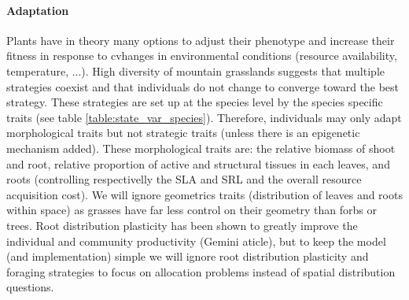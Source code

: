 \documentclass[a4paper,twoside, justified,marginals=raggedright]{tufte-handout}
\begin{document}
\paragraph{Adaptation} Plants have in theory many options to adjust their phenotype and increase their fitness in response to cvhanges in environmental conditions (resource availability, temperature, ...). High diversity of mountain grasslands suggests that multiple strategies coexist and that individuals do not change to converge toward the best strategy. These strategies are set up at the species level by the species specific traits (see table \ref{table:state_var_species}). Therefore, individuals may only adapt morphological traits but not strategic traits (unless there is an epigenetic mechanism added). These morphological traits are: the relative biomass of shoot and root, relative proportion of active and structural tissues in each leaves, and roots (controlling respectivelly the SLA and SRL and the overall resource acquisition cost). We will ignore geometrics traits (distribution of leaves and roots within space) as grasses have far less control on their geometry than forbs or trees. Root distribution plasticity has been shown to greatly improve the individual and community productivity (Gemini aticle), but to keep the model (and implementation) simple we will ignore root distribution plasticity and foraging strategies to focus on allocation problems instead of spatial distribution questions.\\
\end{document}
